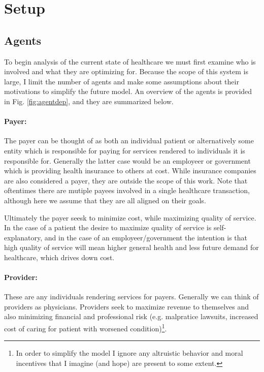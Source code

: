 \documentclass{article}
\begin{document}
\section*{Setup}

\subsection*{Agents}
To begin analysis of the current state of healthcare we must first examine who is involved and what they are optimizing for. Because the scope of this system is large, I limit the number of agents and make some assumptions about their motivations to simplify the future model. An overview of the agents is provided in Fig. \ref{fig:agentdep}, and they are summarized below.

\paragraph*{Payer:}The payer can be thought of as both an individual patient or alternatively some entity which is responsible for paying for services rendered to individuals it is responsible for. Generally the latter case would be an employeer or government which is providing health insurance to others at cost. While insurance companies are also considered a payer, they are outside the scope of this work. Note that oftentimes there are mutiple payees involved in a single healthcare transaction, although here we assume that they are all aligned on their goals.

Ultimately the payer seesk to minimize cost, while maximizing quality of service. In the case of a patient the desire to maximize quality of service is self-explanatory, and in the case of an employeer/government the intention is that high quality of service will mean higher general health and less future demand for healthcare, which drives down cost.

\paragraph*{Provider:}These are any individuals rendering services for payers. Generally we can think of providers as physicians. Providers seek to maximize revenue to themselves and also minimizing financial and professional risk (e.g. malpratice lawsuits, increased cost of caring for patient with worsened condition)\footnote{In order to simplify the model I ignore any altruistic behavior and moral incentives that I imagine (and hope) are present to some extent.}.
\end{document}
